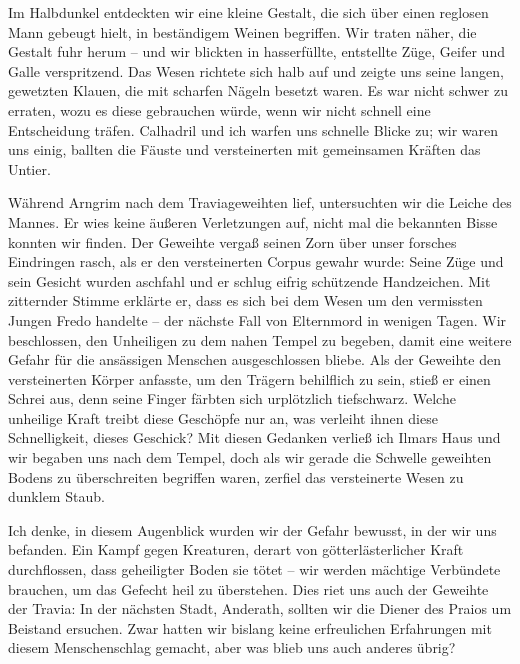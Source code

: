 \documentclass[11pt]{scrreprt}
\begin{document}
Im Halbdunkel entdeckten wir eine kleine Gestalt, die sich über einen reglosen Mann gebeugt hielt, in beständigem Weinen begriffen. Wir traten näher, die Gestalt fuhr herum – und wir blickten in hasserfüllte, entstellte Züge, Geifer und Galle verspritzend. Das Wesen richtete sich halb auf und zeigte uns seine langen, gewetzten Klauen, die mit scharfen Nägeln besetzt waren. Es war nicht schwer zu erraten, wozu es diese gebrauchen würde, wenn wir nicht schnell eine Entscheidung träfen. Calhadril und ich warfen uns schnelle Blicke zu; wir waren uns einig, ballten die Fäuste und versteinerten mit gemeinsamen Kräften das Untier. \par

Während Arngrim nach dem Traviageweihten lief, untersuchten wir die Leiche des Mannes. Er wies keine äußeren Verletzungen auf, nicht mal die bekannten Bisse konnten wir finden. Der Geweihte vergaß seinen Zorn über unser forsches Eindringen rasch, als er den versteinerten Corpus gewahr wurde: Seine Züge und sein Gesicht wurden aschfahl und er schlug eifrig schützende Handzeichen. Mit zitternder Stimme erklärte er, dass es sich bei dem Wesen um den vermissten Jungen Fredo handelte – der nächste Fall von Elternmord in wenigen Tagen. Wir beschlossen, den Unheiligen zu dem nahen Tempel zu begeben, damit eine weitere Gefahr für die ansässigen Menschen ausgeschlossen bliebe. Als der Geweihte den versteinerten Körper anfasste, um den Trägern behilflich zu sein, stieß er einen Schrei aus, denn seine Finger färbten sich urplötzlich tiefschwarz. Welche unheilige Kraft treibt diese Geschöpfe nur an, was verleiht ihnen diese Schnelligkeit, dieses Geschick? Mit diesen Gedanken verließ ich Ilmars Haus und wir begaben uns nach dem Tempel, doch als wir gerade die Schwelle geweihten Bodens zu überschreiten begriffen waren, zerfiel das versteinerte Wesen zu dunklem Staub. \par

Ich denke, in diesem Augenblick wurden wir der Gefahr bewusst, in der wir uns befanden. Ein Kampf gegen Kreaturen, derart von götterlästerlicher Kraft durchflossen, dass geheiligter Boden sie tötet – wir werden mächtige Verbündete brauchen, um das Gefecht heil zu überstehen. Dies riet uns auch der Geweihte der Travia: In der nächsten Stadt, Anderath, sollten wir die Diener des Praios um Beistand ersuchen. Zwar hatten wir bislang keine erfreulichen Erfahrungen mit diesem Menschenschlag gemacht, aber was blieb uns auch anderes übrig?\par
\end{document}
